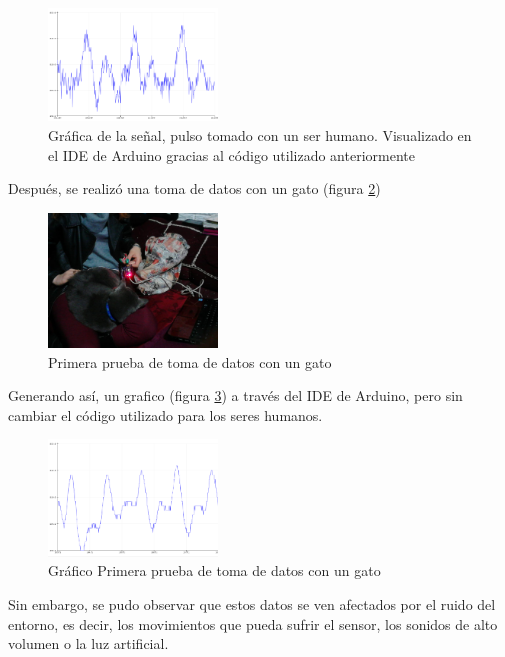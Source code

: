 \documentclass[letterpaper, 10 pt, conference]{ieeeconf}  %
\begin{document}
\begin{figure}
\centering
\includegraphics[width=0.4\textwidth]{senal.png}
\caption{Gr\'afica de la se\~nal, pulso tomado con un ser humano. Visualizado en el IDE de Arduino gracias al c\'odigo utilizado anteriormente}
\label{fig:senal1}
\end{figure}



Despu\'es, se realiz\'o una toma de datos con un gato (figura \ref{fig:cat1})

\begin{figure}
\centering
\includegraphics[width=0.4\textwidth]{cat1.png}
\caption{Primera prueba de toma de datos con un gato}
\label{fig:cat1}
\end{figure}

Generando as\'i, un grafico (figura \ref{fig:cat1Data}) a trav\'es del IDE de Arduino, pero sin cambiar el c\'odigo utilizado para los seres humanos.

\begin{figure}
\centering
\includegraphics[width=0.4\textwidth]{catData.png}
\caption{Gr\'afico Primera prueba de toma de datos con un gato}
\label{fig:cat1Data}
\end{figure}

Sin embargo, se pudo observar que estos datos se ven afectados por el ruido del entorno, es decir, los movimientos que pueda sufrir el sensor, los sonidos de alto volumen o la luz artificial.\\
\end{document}
